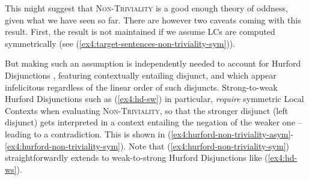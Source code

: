 This might suggest that \textsc{Non-Triviality} is a good enough theory of oddness, given what we have seen so far. There are however two caveats coming with this result. First, the result is not maintained if we assume LCs are computed symmetrically (see (\ref{ex4:target-sentences-non-triviality-sym})). 

\begin{exe}
	\label{ex4:target-sentences-non-triviality-sym}
\end{exe}

But making such an assumption is independently needed to account for Hurford Disjunctions \citep{Hurford1974}, featuring contextually entailing disjunct, and which appear infelicitous regardless of the linear order of such disjuncts. Strong-to-weak Hurford Disjunctions such as (\ref{ex4:hd-sw}) in particular, \textit{require} symmetric Local Contexts when evaluating \textsc{Non-Triviality}, so that the stronger disjunct (left disjunct) gets interpreted in a context entailing the negation of the weaker one -- leading to a contradiction. This is shown in (\ref{ex4:hurford-non-triviality-asym}-\ref{ex4:hurford-non-triviality-sym}). Note that (\ref{ex4:hurford-non-triviality-sym}) straightforwardly extends to weak-to-strong Hurford Disjunctions like (\ref{ex4:hd-ws}).

\begin{exe}
	\ex \label{ex4:hd}
	\begin{xlist}
		\label{ex4:hd-sw}
		\label{ex4:hd-ws}
	\end{xlist}
\end{exe}

\begin{exe}
	\label{ex4:hurford-non-triviality-asym}
	\label{ex4:hurford-non-triviality-sym}
\end{exe}

